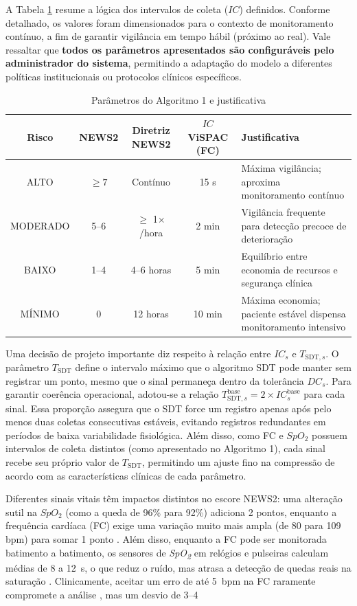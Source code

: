 \documentclass[twoside,english,brazilian]{UNISINOSmonografia}
\begin{document}
A Tabela \ref{tab:derivacao_parametros} resume a lógica dos intervalos de coleta ($IC$) definidos. Conforme detalhado, os valores foram dimensionados para o contexto de monitoramento contínuo, a fim de garantir vigilância em tempo hábil (próximo ao real). Vale ressaltar que \textbf{todos os parâmetros apresentados são configuráveis pelo administrador do sistema}, permitindo a adaptação do modelo a diferentes políticas institucionais ou protocolos clínicos específicos.

\begin{table}[!ht]
\centering
\caption{Parâmetros do Algoritmo 1 e justificativa}
\label{tab:derivacao_parametros}
\footnotesize
\begin{tabular}{|c|c|c|c|p{5cm}|}
\hline
\textbf{Risco} & \textbf{NEWS2} & \textbf{Diretriz NEWS2} & \textbf{$IC$ ViSPAC (FC)} & \textbf{Justificativa} \\ \hline
ALTO & $\ge 7$ & Contínuo & 15 s & Máxima vigilância; aproxima monitoramento contínuo \\ \hline
MODERADO & 5–6 & $\ge$ 1$\times$/hora & 2 min & Vigilância frequente para detecção precoce de deterioração \\ \hline
BAIXO & 1–4 & 4–6 horas & 5 min & Equilíbrio entre economia de recursos e segurança clínica \\ \hline
MÍNIMO & 0 & 12 horas & 10 min & Máxima economia; paciente estável dispensa monitoramento intensivo \\ \hline
\end{tabular}
\end{table}

Uma decisão de projeto importante diz respeito à relação entre $IC_s$ e $T_{\text{SDT},s}$. O parâmetro $T_{\text{SDT}}$ define o intervalo máximo que o algoritmo SDT pode manter sem registrar um ponto, mesmo que o sinal permaneça dentro da tolerância $DC_s$. Para garantir coerência operacional, adotou-se a relação $T_{\text{SDT},s}^{\text{base}} = 2 \times IC^{\text{base}}_s$ para cada sinal. Essa proporção assegura que o SDT force um registro apenas após pelo menos duas coletas consecutivas estáveis, evitando registros redundantes em períodos de baixa variabilidade fisiológica. Além disso, como FC e $SpO_2$ possuem intervalos de coleta distintos (como apresentado no Algoritmo 1), cada sinal recebe seu próprio valor de $T_{\text{SDT}}$, permitindo um ajuste fino na compressão de acordo com as características clínicas de cada parâmetro.

Diferentes sinais vitais têm impactos distintos no escore NEWS2: uma alteração sutil na $SpO_2$ (como a queda de 96\% para 92\%) adiciona 2 pontos, enquanto a frequência cardíaca (FC) exige uma variação muito mais ampla (de 80 para 109 bpm) para somar 1 ponto \cite{RoyalCollege2017}. Além disso, enquanto a FC pode ser monitorada batimento a batimento, os sensores de \textit{SpO\textsubscript{2}} em relógios e pulseiras calculam médias de 8 a 12~s, o que reduz o ruído, mas atrasa a detecção de quedas reais na saturação \cite{Desai2015}. Clinicamente, aceitar um erro de até 5~bpm na FC raramente compromete a análise \cite{REDDY2025}, mas um desvio de 3--4%
\end{document}
